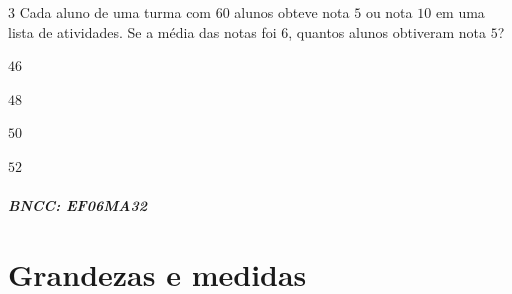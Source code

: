 {%

\num{3}  Cada aluno de uma turma com $60$ alunos obteve nota $5$ ou nota $10$ em uma
lista de atividades. Se a média das notas foi $6$, quantos alunos
obtiveram nota $5$?

\begin{escolha}
\item $46$
\item $48$
\item $50$
\item $52$
\end{escolha}

\paragraph{BNCC: EF06MA32 }


\chapter{Grandezas e medidas}

}
